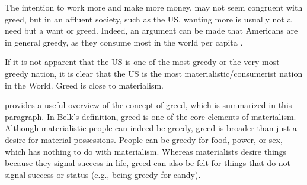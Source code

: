\documentclass[10pt, letterpaper]{article}
\begin{document}
\begin{spacing}{1.8}
The intention to work more and make more money, may not seem congruent with greed, but in an affluent society, such as the US, wanting more is usually not a need
but a want or greed. Indeed, an argument can be made that Americans are in general greedy, as they consume most in the world per capita \citep{leonard10,kasser13}.

If it is not apparent that the US is one of the most greedy or the very most greedy nation, it is clear that the US is the most materialistic/consumerist nation in the World. 
Greed is close to materialism.

\citet{seuntjens15b} provides a useful overview of the concept of greed, which
is summarized in this paragraph. In Belk's  definition, greed is one of the core elements of materialism. Although materialistic people can indeed be greedy, greed is broader than just a desire for material possessions. People can be greedy for food, power, or sex, which has nothing to do with materialism. Whereas materialists desire things because they signal success in life, greed can also be felt for things that do not signal success or status (e.g., being greedy for candy).





\end{spacing}
\end{document}
